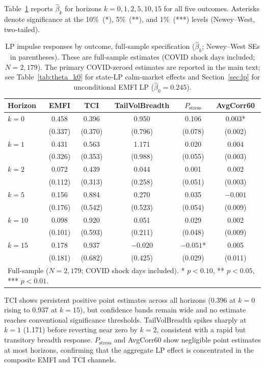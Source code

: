 \documentclass[11pt]{article}
\begin{document}
Table~\ref{tab:app_lp_components} reports $\hat\beta_k$ for horizons $k = 0, 1, 2, 5, 10, 15$ for all five outcomes. Asterisks denote significance at the 10\%~(*), 5\%~(**), and 1\%~(***) levels (Newey--West, two-tailed).

\begin{table}[ht]
\centering
\small
\caption{LP impulse responses by outcome, full-sample specification ($\hat\beta_k$; Newey--West SEs in parentheses).
  These are full-sample estimates (COVID shock days included; $N = 2{,}179$).
  The primary COVID-zeroed estimates are reported in the main text; see Table~\ref{tab:theta_k0}
  for state-LP calm-market effects and Section~\ref{sec:lp} for unconditional EMFI LP ($\hat\beta_0 = 0.245$).}
\label{tab:app_lp_components}
\begin{tabular}{lccccc}
\hline\hline
Horizon & EMFI & TCI & TailVolBreadth & $P_{\text{stress}}$ & AvgCorr60 \\
\hline
$k=0$  & 0.458 & 0.396 & 0.950 & 0.106 & 0.003* \\
       & (0.337) & (0.370) & (0.796) & (0.078) & (0.002) \\
$k=1$  & 0.431 & 0.563 & 1.171 & 0.020 & 0.004 \\
       & (0.326) & (0.353) & (0.988) & (0.055) & (0.003) \\
$k=2$  & 0.072 & 0.439 & 0.044 & 0.001 & 0.002 \\
       & (0.112) & (0.313) & (0.258) & (0.051) & (0.003) \\
$k=5$  & 0.156 & 0.884 & 0.270 & 0.035 & $-0.001$ \\
       & (0.176) & (0.542) & (0.523) & (0.054) & (0.009) \\
$k=10$ & 0.098 & 0.920 & 0.051 & 0.029 & 0.002 \\
       & (0.101) & (0.593) & (0.211) & (0.048) & (0.009) \\
$k=15$ & 0.178 & 0.937 & $-0.020$ & $-0.051$* & 0.005 \\
       & (0.181) & (0.682) & (0.425) & (0.029) & (0.011) \\
\hline\hline
\multicolumn{6}{l}{\footnotesize Full-sample ($N = 2{,}179$; COVID shock days included). * $p<0.10$, ** $p<0.05$, *** $p<0.01$.}
\end{tabular}
\end{table}

TCI shows persistent positive point estimates across all horizons (0.396 at $k=0$ rising to 0.937 at $k=15$), but confidence bands remain wide and no estimate reaches conventional significance thresholds. TailVolBreadth spikes sharply at $k=1$ (1.171) before reverting near zero by $k=2$, consistent with a rapid but transitory breadth response. $P_{\text{stress}}$ and AvgCorr60 show negligible point estimates at most horizons, confirming that the aggregate LP effect is concentrated in the composite EMFI and TCI channels.
\end{document}
